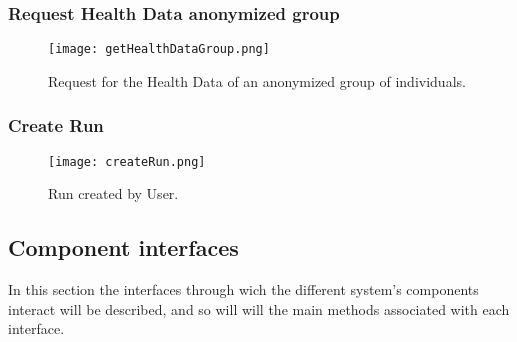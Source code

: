 \documentclass[12pt]{article}
\begin{document}
\subsubsection{Request Health Data anonymized group}

\begin{figure}[H]
    \centering
    \texttt{[image: getHealthDataGroup.png]}
    \caption{Request for the Health Data of an anonymized group of individuals.}
    \label{fig:getHealthDataGroup}
\end{figure}


\subsubsection{Create Run}

\begin{figure}[H]
    \centering
    \texttt{[image: createRun.png]}
    \caption{Run created by User.}
    \label{fig:createRun}
\end{figure}

\subsection{Component interfaces} 
In this section the interfaces through wich the different system's components interact will be described, and so will will the main methods associated with each interface.
\end{document}
